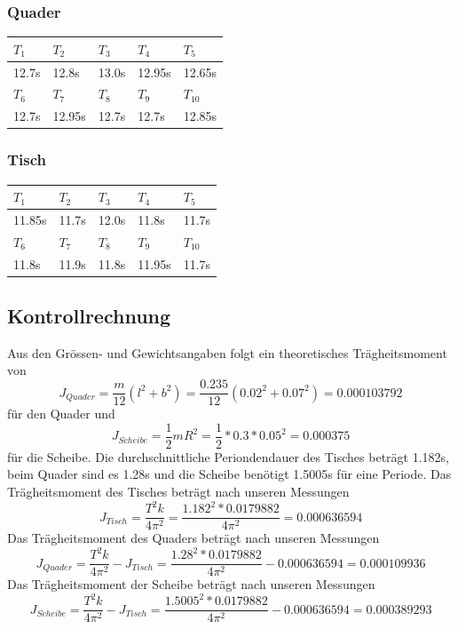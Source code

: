\documentclass[12pt,a4paper]{article}
\begin{document}
\subsubsection*{Quader}
\begin{tabular}{|l|l|l|l|l|}
\hline
$T_{1}$&$T_{2}$&$T_{3}$&$T_{4}$&$T_{5}$\\
\hline
12.7s&12.8s&13.0s&12.95s&12.65s\\
\hline
\hline
$T_{6}$&$T_{7}$&$T_{8}$&$T_{9}$&$T_{10}$\\
\hline
12.7s&12.95s&12.7s&12.7s&12.85s\\
\hline
\end{tabular}

\subsubsection*{Tisch}
\begin{tabular}{|l|l|l|l|l|}
\hline
$T_{1}$&$T_{2}$&$T_{3}$&$T_{4}$&$T_{5}$\\
\hline
11.85s&11.7s&12.0s&11.8s&11.7s\\
\hline
\hline
$T_{6}$&$T_{7}$&$T_{8}$&$T_{9}$&$T_{10}$\\
\hline
11.8s&11.9s&11.8s&11.95s&11.7s\\
\hline
\end{tabular}

\subsection*{Kontrollrechnung}
Aus den Gr\"ossen- und Gewichtsangaben folgt ein theoretisches Tr\"agheitsmoment von
\[ J_{Quader} = \frac{m}{12}(l^2 + b^2) = \frac{0.235}{12}(0.02^2 + 0.07^2) = 0.000103792 \]
f\"ur den Quader und
\[  J_{Scheibe} = \frac{1}{2}mR^2 = \frac{1}{2} * 0.3 * 0.05^2 = 0.000375 \]
f\"ur die Scheibe.
Die durchschnittliche Periondendauer des Tisches betr\"agt 1.182s, beim Quader sind es 1.28s und die Scheibe ben\"otigt 1.5005s f\"ur eine Periode.
Das Tr\"agheitsmoment des Tisches betr\"agt nach unseren Messungen
\[ J_{Tisch} = \frac{T^2k}{4\pi^2} = \frac{1.182^2*0.0179882}{4\pi^2} = 0.000636594 \]
Das Tr\"agheitsmoment des Quaders betr\"agt nach unseren Messungen
\[ J_{Quader} = \frac{T^2k}{4\pi^2} - J_{Tisch} = \frac{1.28^2*0.0179882}{4\pi^2} - 0.000636594 = 0.000109936 \]
Das Tr\"agheitsmoment der Scheibe betr\"agt nach unseren Messungen
\[ J_{Scheibe} = \frac{T^2k}{4\pi^2} - J_{Tisch} = \frac{1.5005^2*0.0179882}{4\pi^2} - 0.000636594 = 0.000389293 \]
\end{document}
